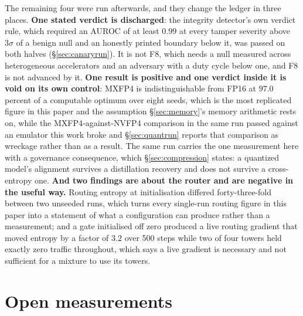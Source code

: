 \documentclass[11pt]{article}
\begin{document}
The remaining four were run afterwards, and they change the ledger in three places. \textbf{One stated verdict is discharged}: the integrity detector's own verdict rule, which required an AUROC of at least $0.99$ at every tamper severity above $3\sigma$ of a benign null and an honestly printed boundary below it, was passed on both halves (\S\ref{sec:canaryrun}). It is not F8, which needs a null measured across heterogeneous accelerators and an adversary with a duty cycle below one, and F8 is not advanced by it. \textbf{One result is positive and one verdict inside it is void on its own control}: MXFP4 is indistinguishable from FP16 at $97.0$ percent of a computable optimum over eight seeds, which is the most replicated figure in this paper and the assumption \S\ref{sec:memory}'s memory arithmetic rests on, while the MXFP4-against-NVFP4 comparison in the same run passed against an emulator this work broke and \S\ref{sec:quantrun} reports that comparison as wreckage rather than as a result. The same run carries the one measurement here with a governance consequence, which \S\ref{sec:compression} states: a quantized model's alignment survives a distillation recovery and does not survive a cross-entropy one. \textbf{And two findings are about the router and are negative in the useful way.} Routing entropy at initialisation differed forty-three-fold between two unseeded runs, which turns every single-run routing figure in this paper into a statement of what a configuration can produce rather than a measurement; and a gate initialised off zero produced a live routing gradient that moved entropy by a factor of $3.2$ over 500 steps while two of four towers held exactly zero traffic throughout, which says a live gradient is necessary and not sufficient for a mixture to use its towers.

\section{Open measurements}
\label{sec:measurements}
\end{document}
